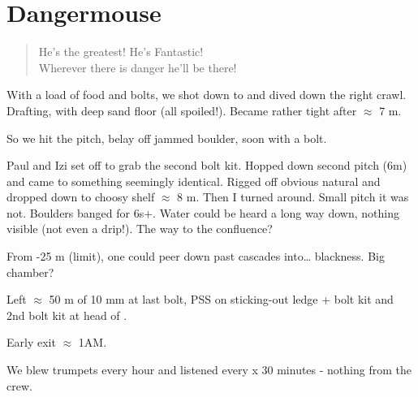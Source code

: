 \section{Dangermouse}


\begin{verse}
\note He's the greatest! He's Fantastic!\\
        Wherever there is danger he'll be there! \enote
\end{verse}



With a load of food and bolts, we shot down to  and dived down the right crawl. Drafting, with deep sand floor (all spoiled!). Became rather tight after $\approx$ 7 m.

So we hit the pitch, belay off jammed boulder, soon with a bolt.

Paul and Izi set off to grab the second bolt kit. Hopped down second pitch (6m) and came to something seemingly identical. Rigged off obvious natural and dropped down to choosy shelf $\approx$ 8 m. Then I turned around. Small pitch it was not. Boulders banged for 6s+. Water could be heard a long way down, nothing visible (not even a drip!). The way
to the  confluence?

From -25 m (limit), one could peer down past cascades into\ldots{} blackness. Big chamber?

Left $\approx$ 50 m of 10 mm at last bolt, PSS on sticking-out ledge + bolt kit and 2nd bolt kit at head of .

Early exit $\approx$ 1AM.

We blew trumpets every hour and listened every x 30 minutes - nothing from the  crew.



